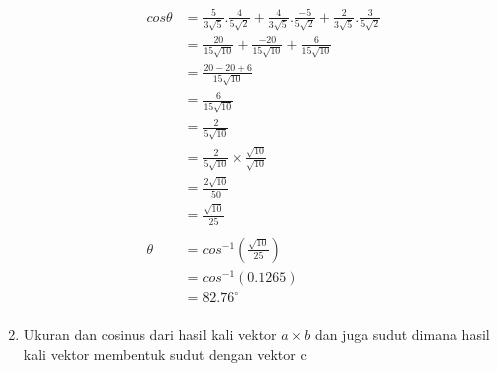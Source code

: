 \documentclass[12pt,titlepage]{article}
\begin{document}
\begin{enumerate}
{        \begin{align*}
            cos\theta &= \frac{5}{3\sqrt{5}} . \frac{4}{5\sqrt{2}} + \frac{4}{3\sqrt{5}} . \frac{-5}{5\sqrt{2}} + \frac{2}{3\sqrt{5}} . \frac{3}{5\sqrt{2}} \\
            &= \frac{20}{15\sqrt{10}} + \frac{-20}{15\sqrt{10}} + \frac{6}{15\sqrt{10}} \\
            &= \frac{20 - 20 + 6}{15\sqrt{10}} \\
            &= \frac{6}{15\sqrt{10}} \\
            &= \frac{2}{5\sqrt{10}} \\
            &= \frac{2}{5\sqrt{10}} \times \frac{\sqrt{10}}{\sqrt{10}} \\
            &= \frac{2\sqrt{10}}{50} \\
            &= \frac{\sqrt{10}}{25} \\
            \\
            \theta &= cos^{-1}(\frac{\sqrt{10}}{25}) \\
            &= cos^{-1}(0.1265) \\
            &= 82.76^{\circ} \\
        \end{align*}
    }
    \pagebreak
    \item {
        Ukuran dan cosinus dari hasil kali vektor $a \times b$ dan juga sudut dimana hasil kali vektor membentuk sudut dengan vektor c

}
\end{enumerate}
\end{document}
